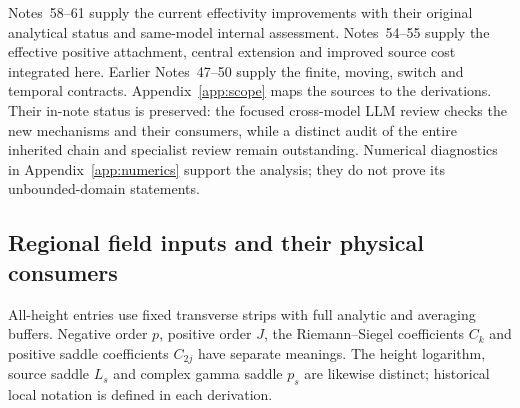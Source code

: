Notes~58--61 \cite{n58,n59,n60,n61} supply the current effectivity
improvements with their original analytical status and same-model
internal assessment. Notes~54--55 \cite{n54,n55} supply the effective positive attachment,
central extension and improved source cost integrated here. Earlier
Notes~47--50 supply the finite, moving, switch and temporal contracts.
Appendix~\ref{app:scope} maps the sources to the derivations. Their
in-note status is preserved: the focused cross-model LLM review checks
the new mechanisms and their consumers, while a distinct audit of the
entire inherited chain and specialist review remain outstanding.
Numerical diagnostics in Appendix~\ref{app:numerics} support the
analysis; they do not prove its unbounded-domain statements.

\subsection{Regional field inputs and their physical consumers}
\label{sec:companion-inputs}
All-height entries use fixed transverse strips with full analytic and
averaging buffers. Negative order $p$, positive order $J$, the
Riemann--Siegel coefficients $C_k$ and positive saddle coefficients
$C_{2j}$ have separate meanings. The height logarithm, source saddle
$L_s$ and complex gamma saddle $p_s$ are likewise distinct; historical
local notation is defined in each derivation.
